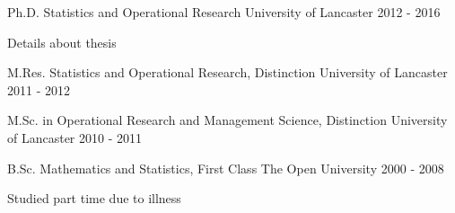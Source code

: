 \begin{cventries}
 \cventry
    {Ph.D. Statistics and Operational Research}
    {University of Lancaster}
    {}
    {2012 - 2016}
    {\begin{cvitems}
        \item Details about thesis
    \end{cvitems}
    }
    
    \cventry
    {M.Res. Statistics and Operational Research, Distinction}
    {University of Lancaster}
    {}
    {2011 - 2012}
    {
     }
     
    \cventry
    {M.Sc. in Operational Research and Management Science, Distinction}
    {University of Lancaster}
    {}
    {2010 - 2011}
    {}
    
    \cventry
    {B.Sc. Mathematics and Statistics, First Class}
    {The Open University}
    {}
    {2000 - 2008}
    {\begin{cvitems}
    \item{Studied part time due to illness}
    \end{cvitems}
    }
\end{cventries}
